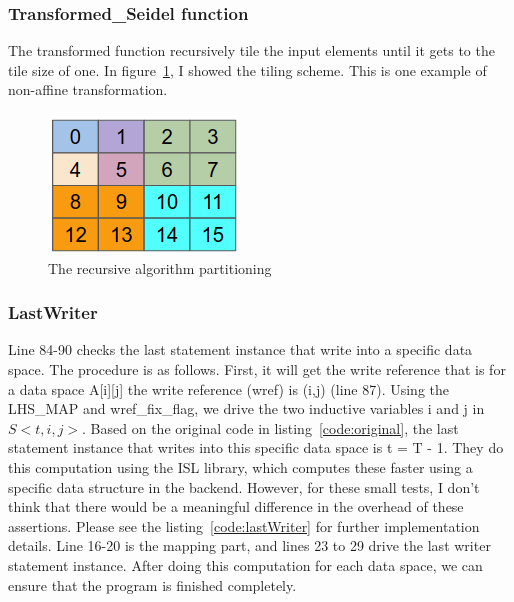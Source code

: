 \documentclass[letterpaper,12pt]{article}
\begin{document}
	\subsubsection{Transformed\_Seidel function}
		The transformed function recursively tile the input elements until it gets to the tile size of one. In figure~\ref{fig:transformed}, I showed the tiling scheme. This is one example of non-affine transformation.
	\begin{figure}[h!]
		\centering
		\includegraphics[scale=1]{fig/transformed.png}
		\caption{The recursive algorithm partitioning}
		\label{fig:transformed}
	\end{figure}

	\subsubsection{LastWriter}
	
	Line 84-90 checks the last statement instance that write into a specific data space. The procedure is as follows. First, it will get the write reference that is for a data space A[i][j] the write reference (wref) is (i,j) (line 87). Using the LHS\_MAP and wref\_fix\_flag, we drive the two inductive variables i and j in $S<t,i,j>$. Based on the original code in listing~\ref{code:original}, the last statement instance that writes into this specific data space is t = T - 1. They do this computation using the ISL library, which computes these faster using a specific data structure in the backend. However, for these small tests, I don't think that there would be a meaningful difference in the overhead of these assertions. Please see the listing~\ref{code:lastWriter} for further implementation details. Line 16-20 is the mapping part, and lines 23 to 29 drive the last writer statement instance. After doing this computation for each data space, we can ensure that the program is finished completely.
\end{document}
